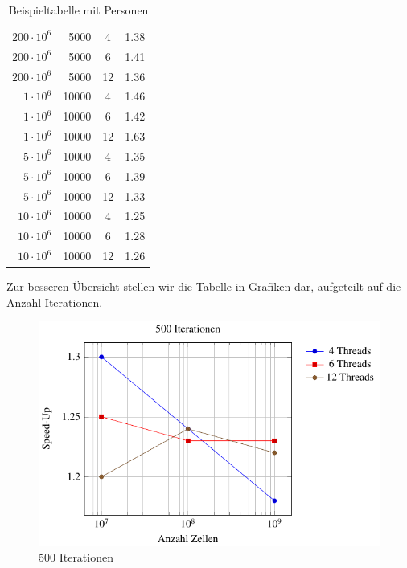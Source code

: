 \begin{table}
\begin{tabular}{r r c l}
		$200 \cdot 10^6$ & 5000 & 4 & 1.38\\
		$200 \cdot 10^6$ & 5000 & 6 & 1.41\\
		$200 \cdot 10^6$ & 5000 & 12 & 1.36\\
		
		$1 \cdot 10^6$ & 10000 & 4  & 1.46 \\
		$1 \cdot 10^6$ & 10000 & 6  & 1.42 \\
		$1 \cdot 10^6$ & 10000 & 12  & 1.63\\
		
		$5 \cdot 10^6$ & 10000 & 4  & 1.35 \\
		$5 \cdot 10^6$ & 10000 & 6  & 1.39 \\
		$5 \cdot 10^6$ & 10000 & 12  & 1.33\\
		
		$10 \cdot 10^6$ & 10000 & 4  & 1.25 \\
		$10 \cdot 10^6$ & 10000 & 6  & 1.28 \\
		$10 \cdot 10^6$ & 10000 & 12  & 1.26\\
		
		
	\end{tabular}
	\caption{Beispieltabelle mit Personen}
\end{table}

Zur besseren Übersicht stellen wir die Tabelle in Grafiken dar, aufgeteilt auf die Anzahl Iterationen.
	
	\begin{figure}
		\centering
		\includegraphics{papers/parallelisierung/images/speedup500.pdf}
		\caption{500 Iterationen}
		\label{parallelisierung:fig:Speedup500}
	\end{figure}
	
